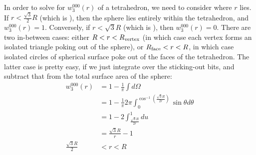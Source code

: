 \documentclass[letterpaper,twocolumn,amsmath,amssymb,pre]{revtex4-1}
\begin{document}
In order to solve for $w_3^{000}(r)$ of a tetrahedron, we need to
consider where $r$ lies.  If $r<\frac{\sqrt{3}}{2}R$ (which is
\Rface), then the sphere lies entirely within the tetrahedron, and
$w_3^{000}(r)=1$.  Conversely, if $r<\sqrt{3}R$ (which is \Rvertex),
then $w_3^{000}(r)=0$.  There are two in-between cases:  either
$R<r<R_{\text{vertex}}$ (in which case each vertex forms an isolated triangle
poking out of the sphere), or $R_{\text{face}}<r<R$, in which case isolated
circles of spherical surface poke out of the faces of the
tetrahedron.  The latter case is pretty easy, if we just integrate
over the sticking-out bits, and subtract that from the total surface
area of the sphere:
\begin{align}
  w_3^{000}(r) &= 1 - \frac1{\pi}\int d\Omega \\
  &= 1 - \frac1{\pi}2\pi \int_0^{\cos^{-1}\left(\frac{\sqrt{3}R}{2r}\right)} \sin\theta d\theta
  \\
  &= 1 - 2 \int^1_{\frac{\sqrt{3}R}{2r}} du
  \\
  &= \frac{\sqrt{3}R}{r} - 1
  \\
  \frac{\sqrt{3}R}{2}&<r<R
\end{align}
\end{document}
